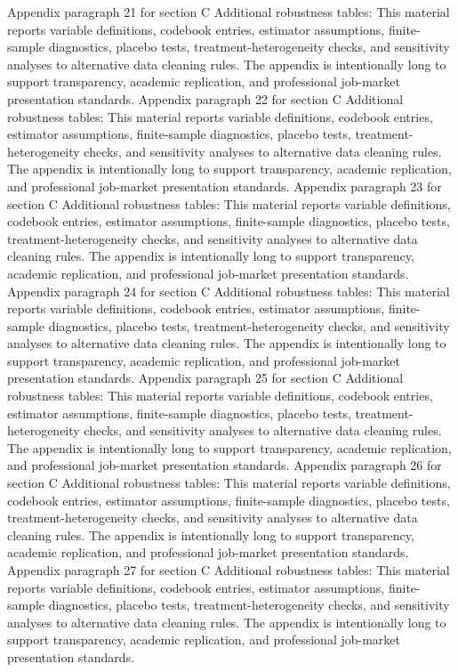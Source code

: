 \documentclass[preprint,12pt]{elsarticle}
\begin{document}
Appendix paragraph 21 for section C Additional robustness tables: This material reports variable definitions, codebook entries, estimator assumptions, finite-sample diagnostics, placebo tests, treatment-heterogeneity checks, and sensitivity analyses to alternative data cleaning rules. The appendix is intentionally long to support transparency, academic replication, and professional job-market presentation standards.
Appendix paragraph 22 for section C Additional robustness tables: This material reports variable definitions, codebook entries, estimator assumptions, finite-sample diagnostics, placebo tests, treatment-heterogeneity checks, and sensitivity analyses to alternative data cleaning rules. The appendix is intentionally long to support transparency, academic replication, and professional job-market presentation standards.
Appendix paragraph 23 for section C Additional robustness tables: This material reports variable definitions, codebook entries, estimator assumptions, finite-sample diagnostics, placebo tests, treatment-heterogeneity checks, and sensitivity analyses to alternative data cleaning rules. The appendix is intentionally long to support transparency, academic replication, and professional job-market presentation standards.
Appendix paragraph 24 for section C Additional robustness tables: This material reports variable definitions, codebook entries, estimator assumptions, finite-sample diagnostics, placebo tests, treatment-heterogeneity checks, and sensitivity analyses to alternative data cleaning rules. The appendix is intentionally long to support transparency, academic replication, and professional job-market presentation standards.
Appendix paragraph 25 for section C Additional robustness tables: This material reports variable definitions, codebook entries, estimator assumptions, finite-sample diagnostics, placebo tests, treatment-heterogeneity checks, and sensitivity analyses to alternative data cleaning rules. The appendix is intentionally long to support transparency, academic replication, and professional job-market presentation standards.
Appendix paragraph 26 for section C Additional robustness tables: This material reports variable definitions, codebook entries, estimator assumptions, finite-sample diagnostics, placebo tests, treatment-heterogeneity checks, and sensitivity analyses to alternative data cleaning rules. The appendix is intentionally long to support transparency, academic replication, and professional job-market presentation standards.
Appendix paragraph 27 for section C Additional robustness tables: This material reports variable definitions, codebook entries, estimator assumptions, finite-sample diagnostics, placebo tests, treatment-heterogeneity checks, and sensitivity analyses to alternative data cleaning rules. The appendix is intentionally long to support transparency, academic replication, and professional job-market presentation standards.
\end{document}

